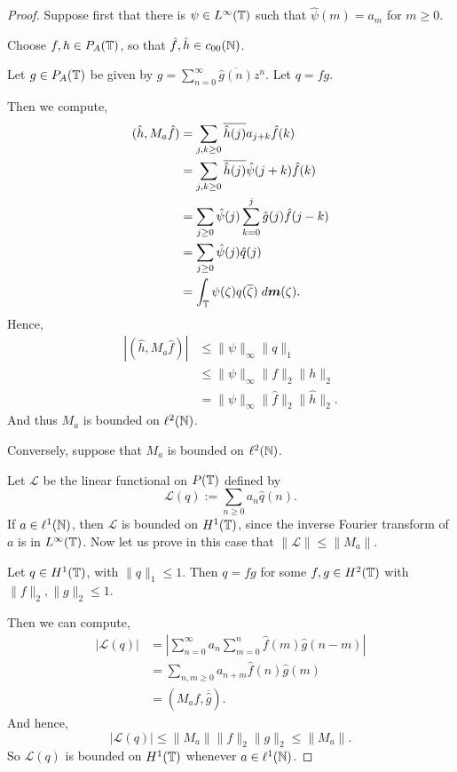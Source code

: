 \begin{proof}
    Suppose first that there is $\psi \in L^\infty(\mathbb{T})$
    such that $\hat{\psi}(m) = a_m$ for $m\geq 0$. 
    
    Choose $f,h \in P_A(\mathbb{T})$, so that $\hat{f},\hat{h} \in c_{00}(\mathbb{N})$.
    
    Let $g \in P_A(\mathbb{T})$ be given by $g = \sum_{n=0}^\infty \overline{\hat{g}(n)}z^n$.
    Let $q = fg$.
    
    Then we compute,
    \begin{align}
        (\hat{h},M_a\hat{f}) &= \sum_{j,k \geq 0} \overline{\hat{h}(j)}a_{j+k}\hat{f}(k)\\
        &= \sum_{j,k\geq 0} \overline{\hat{h}(j)}\hat{\psi}(j+k)\hat{f}(k)\\
        &= \sum_{j \geq 0} \hat{\psi}(j) \sum_{k=0}^j \hat{g}(j)\hat{f}(j-k)\\
        &= \sum_{j \geq 0} \hat{\psi}(j) \hat{q}(j)\\
        &= \int_{\mathbb{T}} \psi(\zeta) q(\overline{\zeta}) \;d\boldsymbol{m}(\zeta).
    \end{align}
    Hence,
    \begin{align}
        |(\hat{h},M_a\hat{f})| &\leq \|\psi\|_{\infty} \|q\|_1\\
                               &\leq \|\psi\|_\infty \|f\|_2 \|h\|_2\\
                               &= \|\psi\|_\infty \|\hat{f}\|_2\|\hat{h}\|_2.
    \end{align}
    And thus $M_a$ is bounded on $\ell^2(\mathbb{N})$.
    
    Conversely, suppose that $M_a$ is bounded on $\ell^2(\mathbb{N})$. 
    
    Let $\mathcal{L}$ be the linear functional on $P(\mathbb{T})$ defined by
    \begin{equation}
        \mathcal{L}(q) := \sum_{n\geq 0} a_n \hat{q}(n).
    \end{equation}
    If $a \in \ell^1(\mathbb{N})$, then $\mathcal{L}$ is bounded on $H^1(\mathbb{T})$,
    since the inverse Fourier transform of $a$ is in $L^\infty(\mathbb{T})$. 
    Now let us prove in this case that $\|\mathcal{L}\| \leq \|M_a\|$. 
    
    Let $q \in H^1(\mathbb{T})$, with $\|q\|_1 \leq 1$. Then $q = fg$
    for some $f,g \in H^2(\mathbb{T})$ with $\|f\|_2,\|g\|_2 \leq 1$. 
    
    Then we can compute,
    \begin{align} 
        |\mathcal{L}(q)| &= \left|\sum_{n=0}^\infty a_n \sum_{m=0}^n \hat{f}(m)\hat{g}(n-m)\right|\\
        &= \sum_{n,m\geq 0} a_{n+m} \hat{f}(n) \hat{g}(m)\\
        &= (M_a \hat{f},\overline{\hat{g}}). 
    \end{align}
    And hence,
    \begin{equation}
        |\mathcal{L}(q)| \leq \|M_a\|\|f\|_2\|g\|_2 \leq \|M_a\|.
    \end{equation}
    So $\mathcal{L}(q)$ is bounded on $H^1(\mathbb{T})$ whenever $a \in \ell^1(\mathbb{N})$. 
    

\end{proof}
